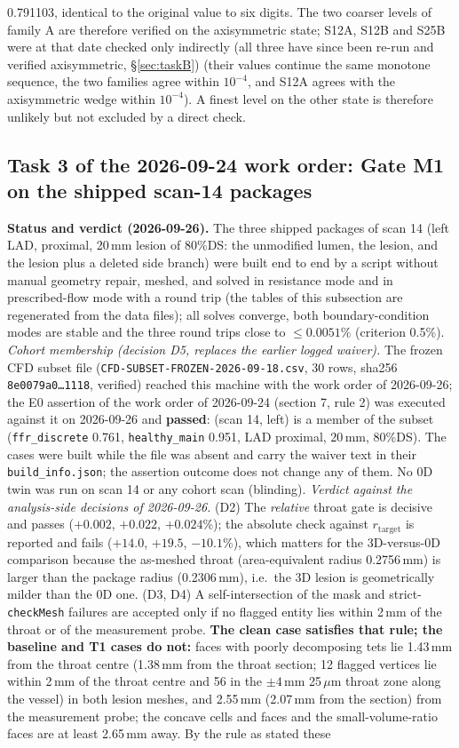 \documentclass[11pt]{article}
\begin{document}
0.791103, identical to the original value to six digits. The two coarser levels of family A are therefore verified on the axisymmetric state; S12A, S12B and S25B were at that date checked only indirectly (all three have since been re-run and verified axisymmetric, \S\ref{sec:taskB}) (their values continue the same monotone sequence, the two families agree within $10^{-4}$, and S12A agrees with the axisymmetric wedge within $10^{-4}$). A finest level on the other state is therefore unlikely but not excluded by a direct check.

\subsection{Task 3 of the 2026-09-24 work order: Gate M1 on the shipped scan-14 packages}
\label{sec:m1}
\textbf{Status and verdict (2026-09-26).} The three shipped packages of scan 14 (left LAD, proximal, 20\,mm lesion of 80\%DS: the unmodified lumen, the lesion, and the lesion plus a deleted side branch) were built end to end by a script without manual geometry repair, meshed, and solved in resistance mode and in prescribed-flow mode with a round trip (the tables of this subsection are regenerated from the data files); all solves converge, both boundary-condition modes are stable and the three round trips close to $\leq0.0051\%$ (criterion 0.5\%). \emph{Cohort membership (decision D5, replaces the earlier logged waiver).} The frozen CFD subset file (\texttt{CFD-SUBSET-FROZEN-2026-09-18.csv}, 30 rows, sha256 \texttt{8e0079a0\dots1118}, verified) reached this machine with the work order of 2026-09-26; the E0 assertion of the work order of 2026-09-24 (section 7, rule 2) was executed against it on 2026-09-26 and \textbf{passed}: (scan 14, left) is a member of the subset (\texttt{ffr\_discrete} 0.761, \texttt{healthy\_main} 0.951, LAD proximal, 20\,mm, 80\%DS). The cases were built while the file was absent and carry the waiver text in their \texttt{build\_info.json}; the assertion outcome does not change any of them. No 0D twin was run on scan 14 or any cohort scan (blinding). \emph{Verdict against the analysis-side decisions of 2026-09-26.} (D2) The \emph{relative} throat gate is decisive and passes ($+0.002$, $+0.022$, $+0.024$\%); the absolute check against $r_\text{target}$ is reported and fails ($+14.0$, $+19.5$, $-10.1$\%), which matters for the 3D-versus-0D comparison because the as-meshed throat (area-equivalent radius 0.2756\,mm) is larger than the package radius (0.2306\,mm), i.e.\ the 3D lesion is geometrically milder than the 0D one. (D3, D4) A self-intersection of the mask and strict-\texttt{checkMesh} failures are accepted only if no flagged entity lies within 2\,mm of the throat or of the measurement probe. \textbf{The clean case satisfies that rule; the baseline and T1 cases do not:} faces with poorly decomposing tets lie 1.43\,mm from the throat centre (1.38\,mm from the throat section; 12 flagged vertices lie within 2\,mm of the throat centre and 56 in the $\pm4$\,mm 25\,$\mu$m throat zone along the vessel) in both lesion meshes, and 2.55\,mm (2.07\,mm from the section) from the measurement probe; the concave cells and faces and the small-volume-ratio faces are at least 2.65\,mm away. By the rule as stated these 
\end{document}
